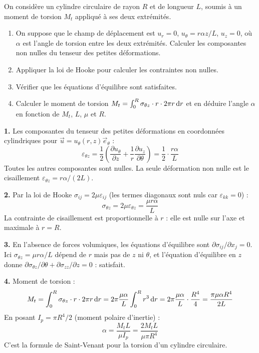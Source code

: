 \documentclass[12pt,a4paper]{article}
\begin{document}
\begin{boiteexercice}
On considère un cylindre circulaire de rayon $R$ et de longueur $L$, soumis à un moment de torsion $M_t$ appliqué à ses deux extrémités.
\begin{enumerate}
  \item On suppose que le champ de déplacement est $u_r = 0$, $u_\theta = r\alpha z/L$, $u_z = 0$, où $\alpha$ est l'angle de torsion entre les deux extrémités. Calculer les composantes non nulles du tenseur des petites déformations.
  \item Appliquer la loi de Hooke pour calculer les contraintes non nulles.
  \item Vérifier que les équations d'équilibre sont satisfaites.
  \item Calculer le moment de torsion $M_t = \int_0^R\sigma_{\theta z}\cdot r\cdot 2\pi r\,\mathrm{d} r$ et en déduire l'angle $\alpha$ en fonction de $M_t$, $L$, $\mu$ et $R$.
\end{enumerate}
\end{boiteexercice}

\begin{boitecorrige}
\textbf{1.} Les composantes du tenseur des petites déformations en coordonnées cylindriques pour $\vec{u} = u_\theta(r,z)\vec{e}_\theta$ :
\[
\varepsilon_{\theta z} = \frac{1}{2}\left(\frac{\partial u_\theta}{\partial z} + \frac{1}{r}\frac{\partial u_z}{\partial\theta}\right) = \frac{1}{2}\cdot\frac{r\alpha}{L}
\]
Toutes les autres composantes sont nulles. La seule déformation non nulle est le cisaillement $\varepsilon_{\theta z} = r\alpha/(2L)$.

\textbf{2.} Par la loi de Hooke $\sigma_{ij} = 2\mu\varepsilon_{ij}$ (les termes diagonaux sont nuls car $\varepsilon_{kk}=0$) :
\[
\sigma_{\theta z} = 2\mu\varepsilon_{\theta z} = \frac{\mu r\alpha}{L}
\]
La contrainte de cisaillement est proportionnelle à $r$ : elle est nulle sur l'axe et maximale à $r=R$.

\textbf{3.} En l'absence de forces volumiques, les équations d'équilibre sont $\partial\sigma_{ij}/\partial x_j = 0$. Ici $\sigma_{\theta z} = \mu r\alpha/L$ dépend de $r$ mais pas de $z$ ni $\theta$, et l'équation d'équilibre en $z$ donne $\partial\sigma_{\theta z}/\partial\theta + \partial\sigma_{zz}/\partial z = 0$ : satisfait.

\textbf{4.} Moment de torsion :
\[
M_t = \int_0^R\sigma_{\theta z}\cdot r\cdot 2\pi r\,\mathrm{d} r = 2\pi\frac{\mu\alpha}{L}\int_0^R r^3\,\mathrm{d} r = 2\pi\frac{\mu\alpha}{L}\cdot\frac{R^4}{4} = \frac{\pi\mu\alpha R^4}{2L}
\]
En posant $I_p = \pi R^4/2$ (moment polaire d'inertie) :
\[
\alpha = \frac{M_t L}{\mu I_p} = \frac{2M_t L}{\mu\pi R^4}
\]
C'est la formule de Saint-Venant pour la torsion d'un cylindre circulaire.
\end{boitecorrige}
\end{document}

